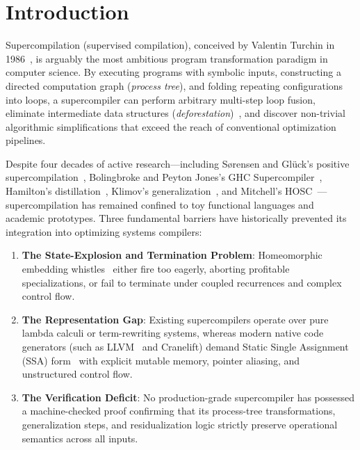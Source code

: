 \section{Introduction}
\label{sec:intro}

Supercompilation (supervised compilation), conceived by Valentin Turchin in 1986~\cite{turchin1986concept}, is arguably the most ambitious program transformation paradigm in computer science. By executing programs with symbolic inputs, constructing a directed computation graph (\textit{process tree}), and folding repeating configurations into loops, a supercompiler can perform arbitrary multi-step loop fusion, eliminate intermediate data structures (\textit{deforestation})~\cite{wadler1990deforestation}, and discover non-trivial algorithmic simplifications that exceed the reach of conventional optimization pipelines.

Despite four decades of active research---including Sørensen and Glück's positive supercompilation~\cite{sorensen1995algorithm}, Bolingbroke and Peyton Jones's GHC Supercompiler~\cite{bolingbroke2010supercompilation}, Hamilton's distillation~\cite{hamilton2007distillation}, Klimov's generalization~\cite{klimov2008generalization}, and Mitchell's HOSC~\cite{mitchell2010hosc}---supercompilation has remained confined to toy functional languages and academic prototypes. Three fundamental barriers have historically prevented its integration into optimizing systems compilers:
\begin{enumerate}
    \item \textbf{The State-Explosion and Termination Problem}: Homeomorphic embedding whistles~\cite{kruskal1960well} either fire too eagerly, aborting profitable specializations, or fail to terminate under coupled recurrences and complex control flow.
    \item \textbf{The Representation Gap}: Existing supercompilers operate over pure lambda calculi or term-rewriting systems, whereas modern native code generators (such as LLVM~\cite{lattner2004llvm} and Cranelift) demand Static Single Assignment (SSA) form~\cite{cytron1991efficiently} with explicit mutable memory, pointer aliasing, and unstructured control flow.
    \item \textbf{The Verification Deficit}: No production-grade supercompiler has possessed a machine-checked proof confirming that its process-tree transformations, generalization steps, and residualization logic strictly preserve operational semantics across all inputs.
\end{enumerate}

